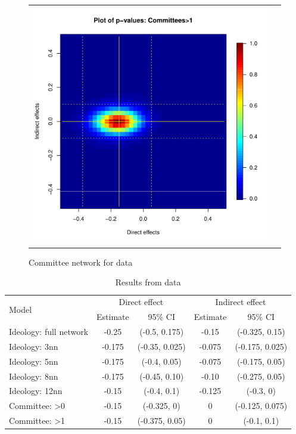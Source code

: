 \documentclass[12pt]{article}
\begin{document}
\begin{figure}
\begin{tabular}{cc}
	\includegraphics[scale=0.45]{./images/pval_plot_coppock_committee_2ormore.pdf}
	\end{tabular}
	\caption{Committee network for  \citet{butler2011can} data}
\end{figure}


\begin{table}[h]
\centering
\begin{tabular}{lcccc}
\toprule
\multirow{2}{*}{Model} & \multicolumn{2}{c}{Direct effect} & \multicolumn{2}{c}{Indirect effect} \\
\cmidrule(l){2-3} \cmidrule(l){4-5}
 & Estimate & 95\% CI & Estimate & 95\% CI \\
\midrule
Ideology: full network  & -0.25 & (-0.5, 0.175) & -0.15 & (-0.325, 0.15)\\
Ideology: 3nn & -0.175 & (-0.35, 0.025) & -0.075 & (-0.175, 0.025)\\
Ideology: 5nn & -0.175 & (-0.4, 0.05) & -0.075 & (-0.175, 0.05)\\
Ideology: 8nn & -0.175 & (-0.45, 0.10) & -0.10 & (-0.275, 0.05)\\
Ideology: 12nn & -0.15 &(-0.4,  0.1) & -0.125 & (-0.3, 0)\\
Committee: >0& -0.15 & (-0.325, 0) & 0 & (-0.125, 0.075)\\
Committee: >1 & -0.15 & (-0.375, 0.05) & 0 & (-0.1, 0.1)\\
\bottomrule
\end{tabular}
\caption{Results from \citet{coppock2014information} data}
\end{table}
\end{document}

